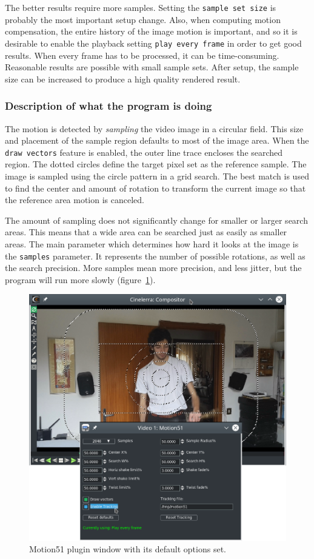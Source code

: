 The better results require more samples. Setting the \texttt{sample set size} is probably the most important setup change. Also, when computing motion compensation, the entire history of the image motion is important, and so it is desirable to enable the playback setting \texttt{play every frame} in order to get good results. When every frame has to be processed, it can be time-consuming. Reasonable results are possible with small sample sets. After setup, the sample size can be increased to produce a high quality rendered result.

\subsubsection*{Description of what the program is doing}
\label{ssub:description_program_doing}

The motion is detected by \textit{sampling} the video image in a circular field. This size and placement of the sample region defaults to most of the image area. When the \texttt{draw vectors} feature is enabled, the outer line trace encloses the searched region. The dotted circles define the target pixel set as the reference sample. The image is sampled using the circle pattern in a grid search. The best match is used to find the center and amount of rotation to transform the current image so that the reference area motion is canceled.

The amount of sampling does not significantly change for smaller or larger search areas. This means that a wide area can be searched just as easily as smaller areas. The main parameter which determines how hard it looks at the image is the \texttt{samples} parameter. It represents the number of possible rotations, as well as the search precision. More samples mean more precision, and less jitter, but the program will run more slowly (figure~\ref{fig:motion51}).

\begin{figure}[htpb]
    \centering
    \includegraphics[width=0.8\linewidth]{images/motion51.png}
    \caption{Motion51 plugin window with its default options set.}
    \label{fig:motion51}
\end{figure}

